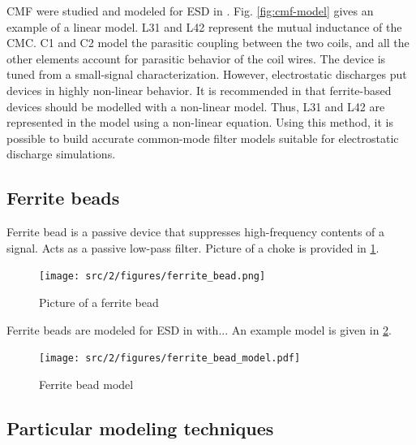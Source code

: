 CMF were studied and modeled for ESD in \cite{usb2ESDProtection}.
Fig. \ref{fig:cmf-model} gives an example of a linear model.
L31 and L42 represent the mutual inductance of the CMC.
C1 and C2 model the parasitic coupling between the two coils, and all the other elements account for parasitic behavior of the coil wires.
The device is tuned from a small-signal characterization.
However, electrostatic discharges put devices in highly non-linear behavior.
It is recommended in \cite{esd-codesign} that ferrite-based devices should be modelled with a non-linear model.
Thus, L31 and L42 are represented in the model using a non-linear equation.
Using this method, it is possible to build accurate common-mode filter models suitable for electrostatic discharge simulations.

\subsection{Ferrite beads}

Ferrite bead is a passive device that suppresses high-frequency contents of a signal.
Acts as a passive low-pass filter.
Picture of a choke is provided in \ref{fig:ferrite-bead}.

\begin{figure}[!h]
  \centering
  \texttt{[image: src/2/figures/ferrite\_bead.png]}
  \caption{Picture of a ferrite bead}
  \label{fig:ferrite-bead}
\end{figure}

Ferrite beads are modeled for ESD in \cite{mixedModeESDSims} with...
An example model is given in \ref{fig:ferrite-model}.

\begin{figure}[!h]
  \centering
  \texttt{[image: src/2/figures/ferrite\_bead\_model.pdf]}
  \caption{Ferrite bead model}
  \label{fig:ferrite-model}
\end{figure}

\subsection{Particular modeling techniques}

